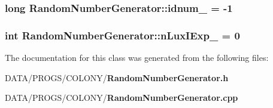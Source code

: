 \subsubsection{\setlength{\rightskip}{0pt plus 5cm}long {\bf RandomNumberGenerator::idnum\_\-} = -1\hspace{0.3cm}{\tt  [static, private]}}\label{classRandomNumberGenerator_fe34100153bf8f8fb51acd9f0bef1af5}


\subsubsection{\setlength{\rightskip}{0pt plus 5cm}int {\bf RandomNumberGenerator::nLuxIExp\_\-} = 0\hspace{0.3cm}{\tt  [static]}}\label{classRandomNumberGenerator_7a5c2be0f01f6265dee7285bc511f956}




The documentation for this class was generated from the following files:\begin{CompactItemize}
\item 
DATA/PROGS/COLONY/{\bf RandomNumberGenerator.h}\item 
DATA/PROGS/COLONY/{\bf RandomNumberGenerator.cpp}\end{CompactItemize}
